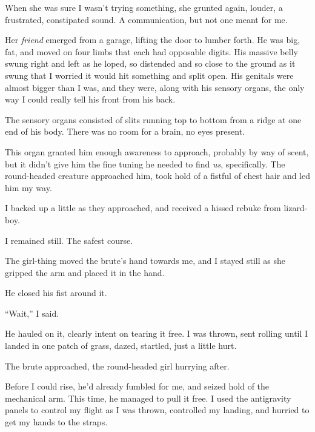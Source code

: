 When she was sure I wasn't trying something, she grunted again, louder, a frustrated, constipated sound.  A communication, but not one meant for me.



Her \emph{friend} emerged from a garage, lifting the door to lumber forth.  He was big, fat, and moved on four limbs that each had opposable digits.  His massive belly swung right and left as he loped, so distended and so close to the ground as it swung that I worried it would hit something and split open. His genitals were almost bigger than I was, and they were, along with his sensory organs, the only way I could really tell his front from his back.



The sensory organs consisted of slits running top to bottom from a ridge at one end of his body.  There was no room for a brain, no eyes present.



This organ granted him enough awareness to approach, probably by way of scent, but it didn't give him the fine tuning he needed to find \emph{us}, specifically.  The round-headed creature approached him, took hold of a fistful of chest hair and led him my way.



I backed up a little as they approached, and received a hissed rebuke from lizard-boy.



I remained still.  The safest course.



The girl-thing moved the brute's hand towards me, and I stayed still as she gripped the arm and placed it in the hand.



He closed his fist around it.



``Wait,'' I said.



He hauled on it, clearly intent on tearing it free.  I was thrown, sent rolling until I landed in one patch of grass, dazed, startled, just a little hurt.



The brute approached, the round-headed girl hurrying after.



Before I could rise, he'd already fumbled for me, and seized hold of the mechanical arm.  This time, he managed to pull it free.  I used the antigravity panels to control my flight as I was thrown, controlled my landing, and hurried to get my hands to the straps.



